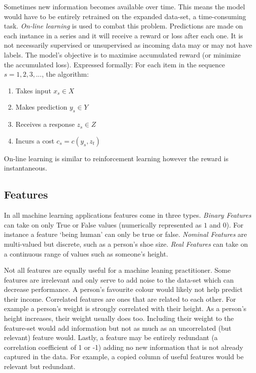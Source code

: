 Sometimes new information becomes available over time. 
This means the model would have to be entirely retrained on the expanded data-set, a time-consuming task. 
\textit{On-line learning} is used to combat this problem.
Predictions are made on each instance in a series and it will receive a reward or loss after each one\citep{sammut2011encyclopedia}.
It is not necessarily supervised or unsupervised as incoming data may or may not have labels.
The model's objective is to maximise accumulated reward (or minimize the accumulated loss).
Expressed formally:
For each item in the sequence $s = 1, 2, 3, ...$, the algorithm:
\begin{enumerate}
\item Takes input $x_s \in X$
\item Makes prediction $y_s \in Y$
\item Receives a response $z_s \in Z$
\item Incurs a cost $c_s = c(y_s, z_t)$
\end{enumerate}
On-line learning is similar to reinforcement learning however the reward is instantaneous.

\subsection{Features}
In all machine learning applications features come in three types.
\textit{Binary Features} can take on only True or False values (numerically represented as $1$ and $0$).
For instance a feature `being human' can only be true or false.
\textit{Nominal Features} are multi-valued but discrete, such as a person's shoe size.
\textit{Real Features} can take on a continuous range of values such as someone's height.

Not all features are equally useful for a machine leaning practitioner.
Some features are irrelevant and only serve to add noise to the data-set which can decrease performance.
A person's favourite colour would likely not help predict their income.
Correlated features are ones that are related to each other.
For example a person's weight is strongly correlated with their height.
As a person's height increases, their weight usually does too.
Including their weight to the feature-set would add information but not as much as an uncorrelated (but relevant) feature would.
Lastly, a feature may be entirely redundant (a correlation coefficient of 1 or -1) adding no new information that is not already captured in the data.
For example, a copied column of useful features would be relevant but redundant. 

